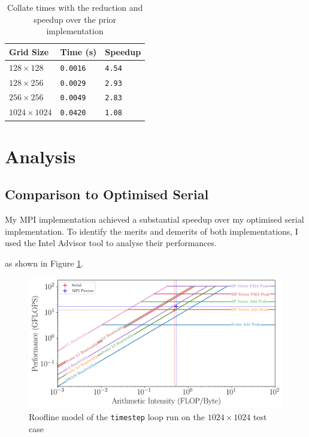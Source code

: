 \documentclass[twocolumn, a4paper]{article}
\begin{document}
\begin{table}[htbp]
  \begin{center}
  \caption{Collate times with the reduction and speedup over the prior implementation}\label{tab:reduction}
  \begin{tabular}[t]{l | l l} 
      \hline\hline
      Grid Size&Time (s)&Speedup\\
      \hline
      $128 \times 128$&\texttt{0.0016}&\texttt{4.54}\\
      $128 \times 256$&\texttt{0.0029}&\texttt{2.93}\\
      $256 \times 256$&\texttt{0.0049}&\texttt{2.83}\\
      $1024 \times 1024$&\texttt{0.0420}&\texttt{1.08}\\
      \hline
    \end{tabular}
  \end{center}
\end{table}

\section{Analysis}

\subsection{Comparison to Optimised Serial}

My MPI implementation achieved a substantial speedup over my optimised serial implementation.
To identify the merits and demerits of both implementations, I used the Intel Advisor tool to analyse their performances.

as shown in Figure \ref{fig:roofline}.

\begin{figure}[htbp]
  \centering
  \includegraphics[width=\linewidth]{roofline.png}
  \caption{Roofline model of the \texttt{timestep} loop run on the $1024\times1024$ test case}\label{fig:roofline}
\end{figure}
\end{document}
